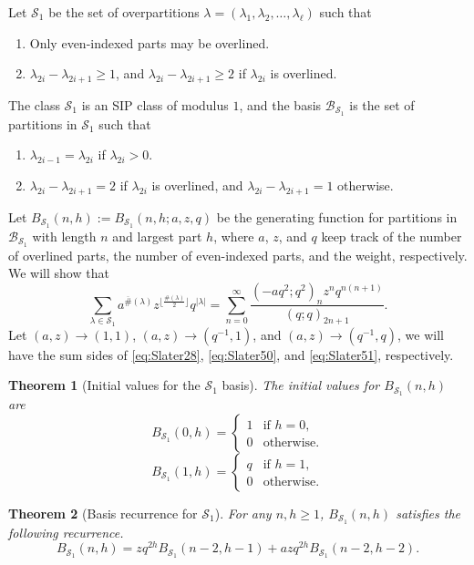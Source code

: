 \documentclass[10pt,a4paper]{amsart}
\newtheorem{theorem}{Theorem}[section]
\numberwithin{equation}{section}
\begin{document}
Let $\mathcal{S}_1$ be the set of overpartitions $\lambda=(\lambda_1,\lambda_2,\ldots,\lambda_{\ell})$ such that
\begin{enumerate}
    \item Only even-indexed parts may be overlined.
    \item $\lambda_{2i}-\lambda_{2i+1}\geq1$, and $\lambda_{2i}-\lambda_{2i+1}\geq2$ if $\lambda_{2i}$ is overlined.
\end{enumerate}
The class $\mathcal{S}_1$ is an SIP class of modulus $1$, and the basis $\mathcal{B}_{\mathcal{S}_1}$ is the set of partitions in $\mathcal{S}_1$ such that
\begin{enumerate}
    \item $\lambda_{2i-1}=\lambda_{2i}$ if $\lambda_{2i}>0$.
    \item $\lambda_{2i}-\lambda_{2i+1}=2$ if $\lambda_{2i}$ is overlined, and $\lambda_{2i}-\lambda_{2i+1}=1$ otherwise.
\end{enumerate}
Let $B_{\mathcal S_1}(n,h):=B_{\mathcal S_1}(n,h;a,z,q)$ be the generating function for partitions in $\mathcal{B}_{\mathcal{S}_1}$ with length $n$ and largest part $h$, where $a$, $z$, and $q$ keep track of the number of overlined parts, the number of even-indexed parts, and the weight, respectively. We will show that
$$\sum_{\lambda\in\mathcal{S}_1}a^{\overline{\#}(\lambda)}z^{\lfloor\frac{\#(\lambda)}{2}\rfloor}q^{|\lambda|}=\sum_{n=0}^{\infty}\frac{(-aq^2;q^2)_{n}z^nq^{n(n+1)}}{(q;q)_{2n+1}}.$$
Let $(a,z)\to(1,1)$, $(a,z)\to(q^{-1},1)$, and $(a,z)\to(q^{-1},q)$, we will have the sum sides of \eqref{eq:Slater28}, \eqref{eq:Slater50}, and \eqref{eq:Slater51}, respectively.


\begin{theorem}[Initial values for the $\mathcal S_1$ basis]\label{thm:S1-initial}
The initial values for $B_{\mathcal S_1}(n,h)$ are
\begin{equation*}
    B_{\mathcal S_1}(0,h)=\begin{cases}
        1 &  \text{if $h=0$,}\\
        0 &  \text{otherwise.}
    \end{cases}
\end{equation*}
\begin{equation*}
    B_{\mathcal S_1}(1,h)=\begin{cases}
        q &  \text{if $h=1$,}\\
        0 &  \text{otherwise.}
            \end{cases}
\end{equation*}
\end{theorem}
\begin{theorem}[Basis recurrence for $\mathcal S_1$]\label{thm:S1-recurrence}
For any $n,h\geq1$, $B_{\mathcal S_1}(n,h)$ satisfies the following recurrence.
\begin{equation}\label{eq:S1Rec}
B_{\mathcal S_1}(n,h)=zq^{2h}B_{\mathcal S_1}(n-2,h-1)+azq^{2h}B_{\mathcal S_1}(n-2,h-2).
\end{equation}
\end{theorem}
\end{document}
